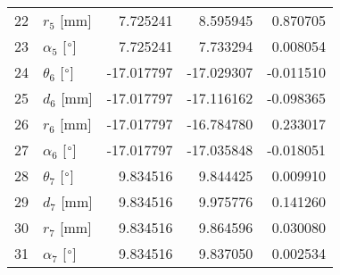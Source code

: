 \documentclass{standalone}%
\begin{document}
\begin{tabular}{llrrr}
22 &              $r_{5}$ [mm] &   7.725241 &   8.595945 &   0.870705 \\
23 &  $\alpha_{5}$ [$\degree$] &   7.725241 &   7.733294 &   0.008054 \\
24 &  $\theta_{6}$ [$\degree$] & -17.017797 & -17.029307 &  -0.011510 \\
25 &              $d_{6}$ [mm] & -17.017797 & -17.116162 &  -0.098365 \\
26 &              $r_{6}$ [mm] & -17.017797 & -16.784780 &   0.233017 \\
27 &  $\alpha_{6}$ [$\degree$] & -17.017797 & -17.035848 &  -0.018051 \\
28 &  $\theta_{7}$ [$\degree$] &   9.834516 &   9.844425 &   0.009910 \\
29 &              $d_{7}$ [mm] &   9.834516 &   9.975776 &   0.141260 \\
30 &              $r_{7}$ [mm] &   9.834516 &   9.864596 &   0.030080 \\
31 &  $\alpha_{7}$ [$\degree$] &   9.834516 &   9.837050 &   0.002534 \\
\bottomrule
\end{tabular}
%
\end{document}
